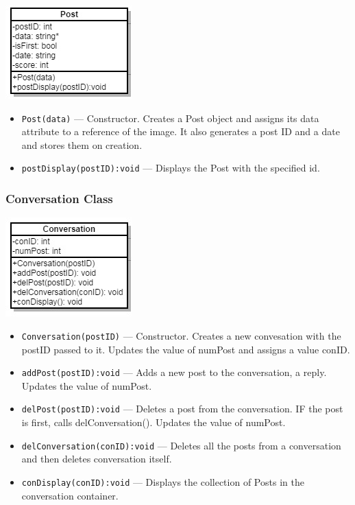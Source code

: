 \documentclass[11pt]{scrartcl}
\begin{document}
            \centerline{\includegraphics{diagrams/post-UML}}

            \begin{itemize}
                \item \texttt{Post(data)} --- Constructor.  Creates a Post object and assigns its data attribute to a reference of the image. It also generates a post ID and a date and stores them on creation.
                \item \texttt{postDisplay(postID):void} --- Displays the Post with the specified id.
            \end{itemize}

        \subsubsection{Conversation Class}

            \centerline{\includegraphics{diagrams/conversation-UML}}

            \begin{itemize}
                \item \texttt{Conversation(postID)} --- Constructor. Creates a new convesation with the postID passed to it.  Updates the value of numPost and assigns a value conID.
                \item \texttt{addPost(postID):void} --- Adds a new post to the conversation, a reply. Updates the value of numPost.
                \item \texttt{delPost(postID):void} --- Deletes a post from the conversation. IF the post is first, calls delConversation(). Updates the value of numPost.
                \item \texttt{delConversation(conID):void} --- Deletes all the posts from a conversation and then deletes conversation itself.
                \item \texttt{conDisplay(conID):void} --- Displays the collection of Posts in the conversation container.
            \end{itemize}
\end{document}
